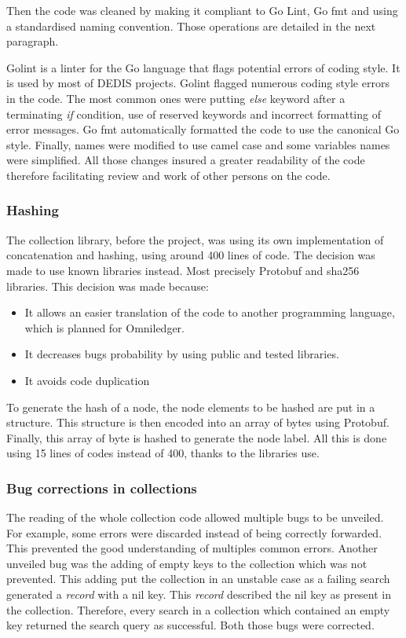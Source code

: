 \documentclass[11pt, a4paper, twoside, openright]{article}
\begin{document}
Then the code was cleaned by making it compliant to Go Lint\cite{Golint}, Go fmt\cite{gofmt} and using a standardised naming convention. Those operations are detailed in the next paragraph.

Golint is a linter for the Go language that flags potential errors of coding style. It is used by most of DEDIS projects. Golint flagged numerous coding style errors in the code. The most common ones were putting \textit{else} keyword after a terminating \textit{if} condition, use of reserved keywords and incorrect formatting of error messages. Go fmt automatically formatted the code to use the canonical Go style. Finally, names were modified to use camel case and some variables names were simplified. All those changes insured a greater readability of the code therefore facilitating review and work of other persons on the code.

\subsubsection{Hashing}
The collection library, before the project, was using its own implementation of concatenation and hashing, using around 400 lines of code. The decision was made to use known libraries instead. Most precisely Protobuf \cite{protobuf} and sha256 libraries. This decision was made because:
\begin{itemize}
\itemsep0em
\item It allows an easier translation of the code to another programming language, which is planned for Omniledger.
\item It decreases bugs probability by using public and tested libraries.
\item It avoids code duplication
\end{itemize}
To generate the hash of a node, the node elements to be hashed are put in a structure. This structure is then encoded into an array of bytes using Protobuf. Finally, this array of byte is hashed to generate the node label. All this is done using 15 lines of codes instead of 400, thanks to the libraries use.

\subsubsection{Bug corrections in collections}
The reading of the whole collection code allowed multiple bugs to be unveiled. For example, some errors were discarded instead of being correctly forwarded. This prevented the good understanding of multiples common errors. Another unveiled bug was the adding of empty keys to the collection which was not prevented. This adding put the collection in an unstable case as a failing search generated a \textit{record} with a nil key. This \textit{record} described the nil key as present in the collection. Therefore, every search in a collection which contained an empty key returned the search query as successful. Both those bugs were corrected.
\end{document}
